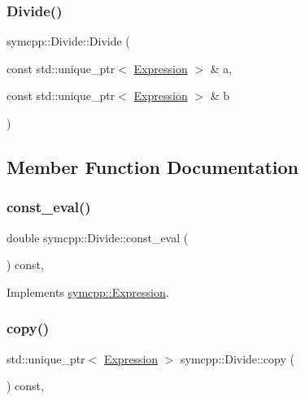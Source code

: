 \subsubsection{\texorpdfstring{Divide()}{Divide()}\hspace{0.1cm}{\footnotesize\ttfamily [2/2]}}
{\footnotesize\ttfamily symcpp\+::\+Divide\+::\+Divide (\begin{DoxyParamCaption}\item[{const std\+::unique\+\_\+ptr$<$ \mbox{\hyperlink{classsymcpp_1_1Expression}{Expression}} $>$ \&}]{a,  }\item[{const std\+::unique\+\_\+ptr$<$ \mbox{\hyperlink{classsymcpp_1_1Expression}{Expression}} $>$ \&}]{b }\end{DoxyParamCaption})}



\subsection{Member Function Documentation}
\mbox{\label{classsymcpp_1_1Divide_a18ab0e9eddd473ee5400607b9e6ea2b0}} 
\subsubsection{\texorpdfstring{const\_eval()}{const\_eval()}}
{\footnotesize\ttfamily double symcpp\+::\+Divide\+::const\+\_\+eval (\begin{DoxyParamCaption}{ }\end{DoxyParamCaption}) const\hspace{0.3cm}{\ttfamily [override]}, {\ttfamily [virtual]}}



Implements \mbox{\hyperlink{classsymcpp_1_1Expression_a81c8069347f586cb5632338d97c278ad}{symcpp\+::\+Expression}}.

\mbox{\label{classsymcpp_1_1Divide_a6e4eeef806e8bded246e87d0036effee}} 
\subsubsection{\texorpdfstring{copy()}{copy()}}
{\footnotesize\ttfamily std\+::unique\+\_\+ptr$<$ \mbox{\hyperlink{classsymcpp_1_1Expression}{Expression}} $>$ symcpp\+::\+Divide\+::copy (\begin{DoxyParamCaption}{ }\end{DoxyParamCaption}) const\hspace{0.3cm}{\ttfamily [override]}, {\ttfamily [virtual]}}




